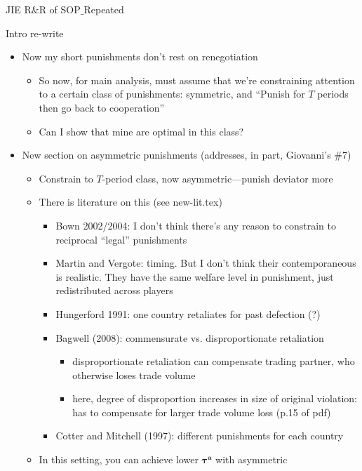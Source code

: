 \documentclass[12pt]{article}
\newcommand{\bta}{\bm{\tau^a}}
\begin{document}
\begin{center}
JIE R$\&$R of SOP$\_$Repeated
\end{center}


Intro re-write
\begin{itemize}	
	\item Now my short punishments don't rest on renegotiation
		\begin{itemize}
			\item So now, for main analysis, must assume that we're constraining attention to a certain class of punishments: symmetric, and ``Punish for $T$ periods then go back to cooperation''
			\item Can I show that mine are optimal in this class?
		\end{itemize}
	
	\item New section on asymmetric punishments (addresses, in part, Giovanni's $\#$7)
		\begin{itemize}
			\item Constrain to $T$-period class, now asymmetric---punish deviator more
			\item There is literature on this (see new-lit.tex)
				\begin{itemize}
					\item Bown 2002/2004: I don't think there's any reason to constrain to reciprocal ``legal'' punishments
					\item Martin and Vergote: timing. But I don't think their contemporaneous is realistic. They have the same welfare level in punishment, just redistributed across players
					\item Hungerford 1991: one country retaliates for past defection (?)
					\item Bagwell (2008): commensurate vs. disproportionate retaliation
						\begin{itemize}
							\item disproportionate retaliation can compensate trading partner, who otherwise loses trade volume
							\item here, degree of disproportion increases in size of original violation: has to compensate for larger trade volume loss (p.15 of pdf)
						\end{itemize}
					\item Cotter and Mitchell (1997): different punishments for each country
				\end{itemize}
			\item In this setting, you can achieve lower $\bta$ with asymmetric
		\end{itemize}
	

\end{itemize}
\end{document}
